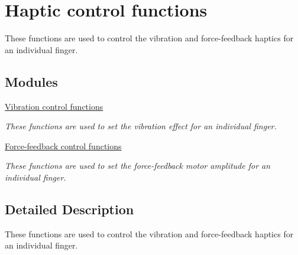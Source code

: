 \hypertarget{group__haptics_control}{}\section{Haptic control functions}
\label{group__haptics_control}


These functions are used to control the vibration and force-\/feedback haptics for an individual finger.  


\subsection*{Modules}
\begin{DoxyCompactItemize}
\item 
\hyperlink{group__vibration_control}{Vibration control functions}
\begin{DoxyCompactList}\small\item\em These functions are used to set the vibration effect for an individual finger. \end{DoxyCompactList}\item 
\hyperlink{group__force_feedback_control}{Force-\/feedback control functions}
\begin{DoxyCompactList}\small\item\em These functions are used to set the force-\/feedback motor amplitude for an individual finger. \end{DoxyCompactList}\end{DoxyCompactItemize}


\subsection{Detailed Description}
These functions are used to control the vibration and force-\/feedback haptics for an individual finger. 

